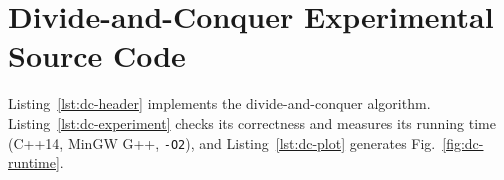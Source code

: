 \section{Divide-and-Conquer Experimental Source Code}

Listing~\ref{lst:dc-header} implements the
divide-and-conquer algorithm. Listing~\ref{lst:dc-experiment}
checks its correctness and measures its running time
(C++14, MinGW G++, \texttt{-O2}), and
Listing~\ref{lst:dc-plot} generates Fig.~\ref{fig:dc-runtime}.






